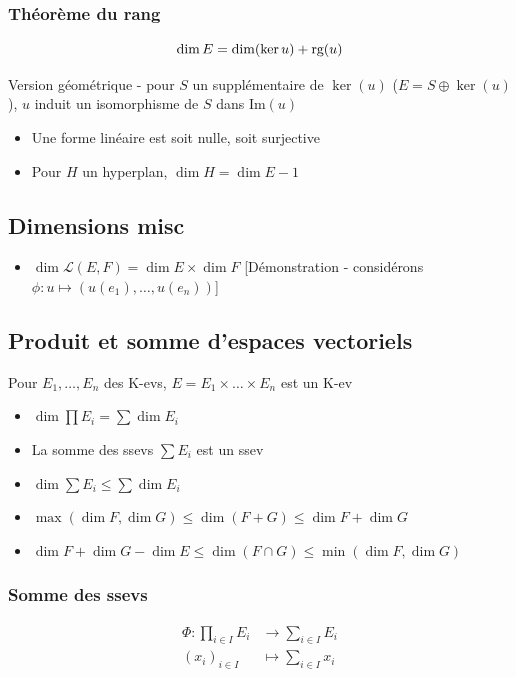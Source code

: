 \documentclass[openany]{book}
\begin{document}
\subsubsection{Théorème du rang}

\[ \dim E = \dim( \ker u ) + \text{rg}(u) \]

Version géométrique - pour $S$ un supplémentaire de $\ker (u)$ ($E = S \oplus \ker (u)$), $u$ induit un isomorphisme de $S$ dans $\text{Im}(u)$

\begin{itemize}
    \item Une forme linéaire est soit nulle, soit surjective
    \item Pour $H$ un hyperplan, $\dim H = \dim E - 1$
\end{itemize}

\subsection{Dimensions misc}
\begin{itemize}
    \item $\dim \mathcal{L}(E, F) = \dim E \times \dim F$ [Démonstration - considérons $\phi : u \mapsto (u(e_1), \dots , u(e_n))$]
\end{itemize}

\subsection{Produit et somme d'espaces vectoriels}
Pour $E_1, \dots , E_n$ des K-evs, $E = E_1 \times \dots \times E_n$ est un K-ev
\begin{itemize}
    \item $\dim \prod E_i = \sum \dim E_i$
    \item La somme des ssevs $\sum E_i$ est un ssev
    \item $\dim \sum E_i \leq \sum \dim E_i$
    \item $\max(\dim F, \dim G) \leq \dim (F+G) \leq \dim F + \dim G$
    \item $\dim F + \dim G - \dim E \leq \dim(F \cap G) \leq \min(\dim F, \dim G)$
\end{itemize}

\subsubsection{Somme des ssevs}
\begin{align*}
    \Phi : \prod_{i\in I}E_i & \rightarrow \sum_{i\in I} E_i \\
    (x_i)_{i\in I} & \mapsto \sum_{i\in I} x_i
\end{align*}
\end{document}
